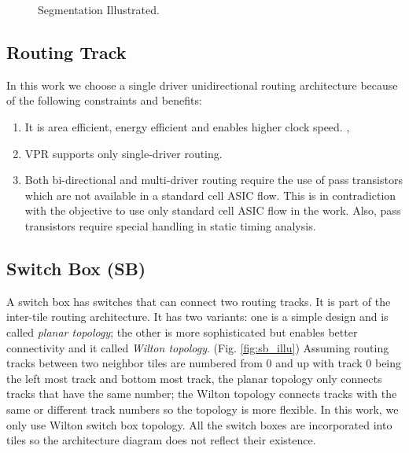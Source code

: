 \begin{figure}[htp]
	\begin{center}
		\epsfxsize=3.5in
		    \renewcommand{\captionfont}{\small}
				\caption{Segmentation Illustrated.
				\label{fig:segementation}}
	\end{center}
\end{figure}

\subsection{Routing Track}
In this work we choose a single driver unidirectional routing architecture because of the following constraints and benefits:

\begin{enumerate}
  \item It is area efficient, energy efficient and enables higher clock speed. \cite{5377675}, \cite{1393249}
  \item VPR supports only single-driver routing. \cite{Luu:2011:VFC:2068716.2068718}
  \item Both bi-directional and multi-driver routing require the use of pass transistors which are not available in a standard cell ASIC flow. This is
	in contradiction with the objective to use only standard cell ASIC flow in the work. Also, pass transistors require special handling in 
	static timing analysis. 
\end{enumerate}

\subsection{Switch Box (SB)}
A switch box has switches that can connect two routing tracks. It is part of the inter-tile routing architecture. It has two variants: 
one is a simple design and is called \emph{planar topology}; the other is more
sophisticated but enables better connectivity and it called \emph{Wilton topology}. (Fig. \ref{fig:sb_illu})
Assuming routing tracks between two neighbor tiles are numbered
from 0 and up with track 0 being the left most track and bottom most track,
 the planar topology only connects tracks that have the same number; 
the Wilton topology connects tracks with the same or different track numbers so the topology is more flexible.
 In this work, we only use Wilton switch box topology. All the switch boxes are incorporated into tiles
 so the architecture diagram does not reflect their existence. \par

